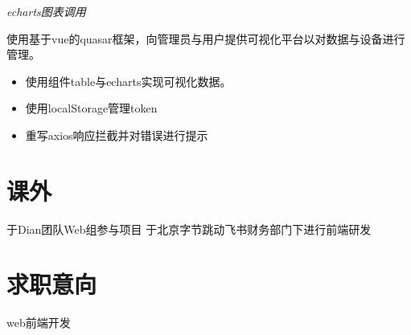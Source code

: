 \textit{echarts图表调用}
\vspace{0.4ex}

使用基于vue的quasar框架，向管理员与用户提供可视化平台以对数据与设备进行管理。
\begin{itemize}
  \item 使用组件table与echarts实现可视化数据。
  \item 使用localStorage管理token
  \item 重写axios响应拦截并对错误进行提示
\end{itemize}



\section{课外}
于Dian团队Web组参与项目
于北京字节跳动飞书财务部门下进行前端研发
\section{求职意向}
web前端开发
